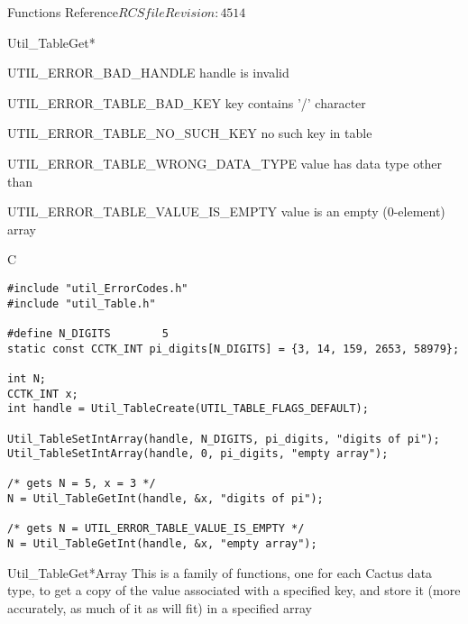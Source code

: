 \begin{cactuspart}{ Functions Reference}{$RCSfile$}{$Revision: 4514 $}
\begin{FunctionDescription}{Util\_TableGet*}
\begin{ErrorSection}
\begin{Error}{UTIL\_ERROR\_BAD\_HANDLE}
handle is invalid
\end{Error}
\begin{Error}{UTIL\_ERROR\_TABLE\_BAD\_KEY}
key contains '/' character
\end{Error}
\begin{Error}{UTIL\_ERROR\_TABLE\_NO\_SUCH\_KEY}
no such key in table
\end{Error}
\begin{Error}{UTIL\_ERROR\_TABLE\_WRONG\_DATA\_TYPE}
value has data type other than 
\end{Error}
\begin{Error}{UTIL\_ERROR\_TABLE\_VALUE\_IS\_EMPTY}
value is an empty (0-element) array
\end{Error}
\end{ErrorSection}

\begin{ExampleSection}
\begin{Example}{C}
\begin{verbatim}
#include "util_ErrorCodes.h"
#include "util_Table.h"

#define N_DIGITS        5
static const CCTK_INT pi_digits[N_DIGITS] = {3, 14, 159, 2653, 58979};

int N;
CCTK_INT x;
int handle = Util_TableCreate(UTIL_TABLE_FLAGS_DEFAULT);

Util_TableSetIntArray(handle, N_DIGITS, pi_digits, "digits of pi");
Util_TableSetIntArray(handle, 0, pi_digits, "empty array");

/* gets N = 5, x = 3 */
N = Util_TableGetInt(handle, &x, "digits of pi");

/* gets N = UTIL_ERROR_TABLE_VALUE_IS_EMPTY */
N = Util_TableGetInt(handle, &x, "empty array");
\end{verbatim}
\end{Example}
\end{ExampleSection}
\end{FunctionDescription}


\begin{FunctionDescription}{Util\_TableGet*Array}
\label{Util-TableGet*Array}
This is a family of functions, one for each Cactus data type,
to get a copy of the value associated with a specified key, and store
it (more accurately, as much of it as will fit) in a specified array


\end{FunctionDescription}
\end{cactuspart}

